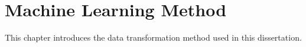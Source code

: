 \chapter{Machine Learning Method}
\label{ch:machine}

This chapter introduces the data transformation method used in this dissertation.
